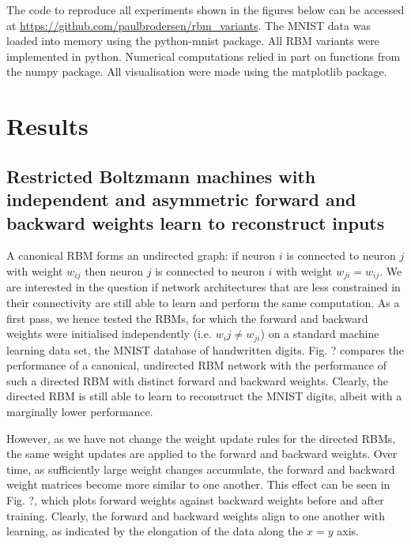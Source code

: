 \documentclass[11pt]{article}
\begin{document}
The code to reproduce all experiments shown in the figures below can
be accessed at \url{https://github.com/paulbrodersen/rbm_variants}. The
MNIST data was loaded into memory using the python-mnist package. All
RBM variants were implemented in python. Numerical computations relied
in part on functions from the numpy package. All visualisation were
made using the matplotlib package.


\section{Results}

\subsection{Restricted Boltzmann machines with independent and asymmetric forward and backward weights learn to reconstruct inputs}

A canonical RBM forms an undirected graph: if neuron $i$ is connected
to neuron $j$ with weight $w_{ij}$ then neuron $j$ is connected to neuron
$i$ with weight $w_{ji} = w_{ij}$. We are interested in the question if
network architectures that are less constrained in their connectivity
are still able to learn and perform the same computation. As a first
pass, we hence tested the RBMs, for which the forward and backward
weights were initialised independently (i.e. $w_ij \neq w_{ji}$) on a
standard machine learning data set, the MNIST database of handwritten
digits. Fig. ? compares the performance of a canonical, undirected RBM
network with the performance of such a directed RBM with distinct
forward and backward weights. Clearly, the directed RBM is still able
to learn to reconstruct the MNIST digits, albeit with a marginally
lower performance.

However, as we have not change the weight update rules for the
directed RBMs, the same weight updates are applied to the forward and
backward weights. Over time, as sufficiently large weight changes
accumulate, the forward and backward weight matrices become more
similar to one another. This effect can be seen in Fig. ?, which plots
forward weights against backward weights before and after
training. Clearly, the forward and backward weights align to one
another with learning, as indicated by the elongation of the data
along the $x=y$ axis.
\end{document}
